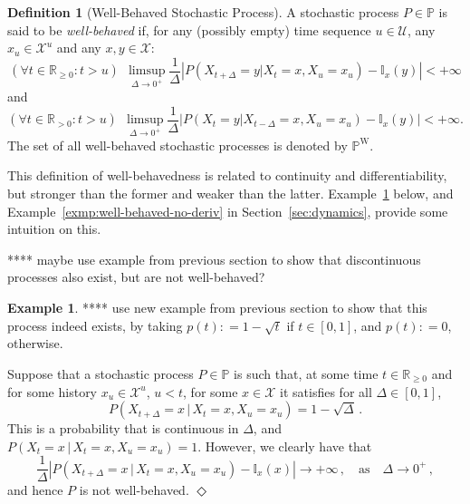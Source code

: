 \documentclass[10pt,a4paper]{paper}
\theoremstyle{definition}
\newtheorem{exmp}{Example}%
\newtheorem{definition}{Definition}
\newcommand{\reals}{\mathbb{R}}
\newcommand{\realsnonneg}{\reals_{\geq 0}}
\newcommand{\states}{\mathcal{X}}
\newcommand{\processes}{\mathbb{P}}
\newcommand{\wprocesses}{\processes^{\mathrm{W}}}
\newcommand{\ind}[1]{\mathbb{I}_{#1}}
\newcommand{\abs}[1]{\left\vert #1 \right\vert}
\newcommand{\coloneqq}{:\!=}
\newcommand{\exampleend}{\hfill$\Diamond$}
\begin{document}

\begin{definition}[Well-Behaved Stochastic Process]
\label{def:well-behaved}
A stochastic process $P\in\processes$ is said to be \emph{well-behaved} if, for any (possibly empty) time sequence $u\in\mathcal{U}$, any $x_u\in\states^u$ and any $x,y\in\states$:
\begin{equation}\label{eq:def:well-behaved:right}
(\forall t\in\reals_{\geq0}
\colon t> u)~~
\limsup_{\Delta\to 0^{+}}\frac{1}{\Delta}\abs{P(X_{t+\Delta}=y\vert X_t=x, X_u=x_u)-\ind{x}(y)}<+\infty
\end{equation}
and
\begin{equation}\label{eq:def:well-behaved:left}
(\forall t\in\reals_{>0}
\colon t> u)~~
\limsup_{\Delta\to 0^{+}}\frac{1}{\Delta}\abs{P(X_{t}=y\vert X_{t-\Delta}=x, X_u=x_u)-\ind{x}(y)}<+\infty.
\end{equation}
The set of all well-behaved stochastic processes is denoted by $\wprocesses$.
\end{definition}

This definition of well-behavedness is related to continuity and differentiability, but stronger than the former and weaker than the latter. Example~\ref{exmp:well-behaved} below, and Example~\ref{exmp:well-behaved-no-deriv} in Section~\ref{sec:dynamics}, provide some intuition on this.

**** maybe use example from previous section to show that discontinuous processes also exist, but are not well-behaved?

\begin{exmp}\label{exmp:well-behaved}
**** use new example from previous section to show that this process indeed exists, by taking $p(t)\coloneqq 1-\sqrt{t}$ if $t\in[0,1]$, and $p(t)\coloneqq 0$, otherwise.

Suppose that a stochastic process $P\in\processes$ is such that, at some time $t\in\realsnonneg$ and for some history $x_u\in\states^u$, $u<t$, for some $x\in\states$ it satisfies for all $\Delta\in[0,1]$,
\begin{equation*}
P(X_{t+\Delta}=x\,\vert\,X_{t}=x,X_u=x_u) = 1-\sqrt{\Delta}\,.
\end{equation*}
This is a probability that is continuous in $\Delta$, and $P(X_{t}=x\,\vert\,X_{t}=x,X_u=x_u) = 1$. However, we clearly have that
\begin{equation*}
\frac{1}{\Delta}\abs{P(X_{t+\Delta}=x\,\vert\,X_{t}=x,X_u=x_u) - \ind{x}(x)} \to +\infty\,,\quad\text{as}\quad \Delta\to0^+\,,
\end{equation*}
and hence $P$ is not well-behaved.
\exampleend
\end{exmp}
\end{document}
